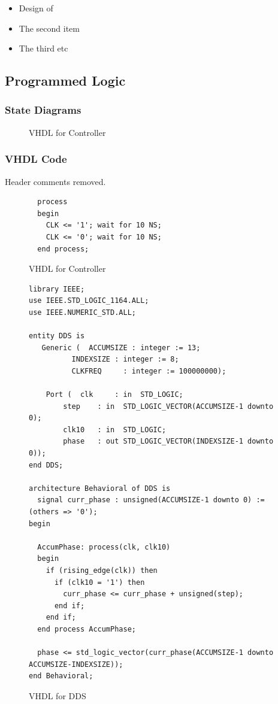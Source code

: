 \documentclass{article}
\begin{document}
      \begin{itemize}
        \item Design of
        \item The second item
        \item The third etc 
      \end{itemize}

  \subsection{Programmed Logic}

    \subsubsection{State Diagrams}

    	\begin{figure}[H]
        \caption{VHDL for Controller}
      	\end{figure}

    \subsubsection{VHDL Code}
      Header comments removed.

      \begin{figure}[H]
        \caption{VHDL for Controller}
        \begin{verbatim}
  process
  begin
    CLK <= '1'; wait for 10 NS;
    CLK <= '0'; wait for 10 NS;
  end process;
        \end{verbatim}
      \end{figure}

      \begin{figure}[H]
        \caption{VHDL for DDS}
        \begin{verbatim}
library IEEE;
use IEEE.STD_LOGIC_1164.ALL;
use IEEE.NUMERIC_STD.ALL;

entity DDS is
   Generic (  ACCUMSIZE : integer := 13;
          INDEXSIZE : integer := 8;
          CLKFREQ     : integer := 100000000);
          
    Port (  clk     : in  STD_LOGIC;
        step    : in  STD_LOGIC_VECTOR(ACCUMSIZE-1 downto 0);
        clk10   : in  STD_LOGIC;
        phase   : out STD_LOGIC_VECTOR(INDEXSIZE-1 downto 0));
end DDS;

architecture Behavioral of DDS is
  signal curr_phase : unsigned(ACCUMSIZE-1 downto 0) := (others => '0');
begin

  AccumPhase: process(clk, clk10)
  begin
    if (rising_edge(clk)) then      
      if (clk10 = '1') then     
        curr_phase <= curr_phase + unsigned(step);
      end if;
    end if;
  end process AccumPhase;
  
  phase <= std_logic_vector(curr_phase(ACCUMSIZE-1 downto ACCUMSIZE-INDEXSIZE));
end Behavioral;
        \end{verbatim}
      \end{figure}
\end{document}
